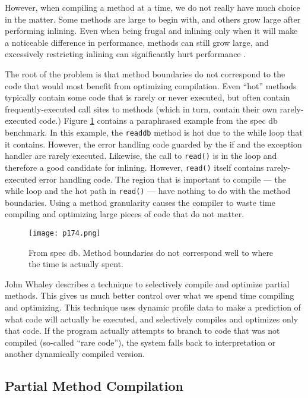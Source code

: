 However, when compiling a method at a time, we do not
really have much choice in the matter. Some methods are
large to begin with, and others grow large after performing
inlining. Even when being frugal and inlining only when it
will make a noticeable difference in performance, methods
can still grow large, and excessively restricting inlining can
significantly hurt performance \cite{suganuma2000overview}.


The root of the problem is that method boundaries do not
correspond to the code that would most benefit from optimizing compilation. Even “hot” methods typically contain
some code that is rarely or never executed, but often contain frequently-executed call sites to methods (which in turn,
contain their own rarely-executed code.) Figure \ref{fig:p174} contains a
paraphrased example from the spec db benchmark. In
this example, the \texttt{readdb} method is hot due to the while
loop that it contains. However, the error handling code
guarded by the if and the exception handler are rarely
executed. Likewise, the call to \texttt{read()} is in the loop and
therefore a good candidate for inlining. However, \texttt{read()}
itself contains rarely-executed error handling code. The region that is important to compile — the while loop and the
hot path in \texttt{read()} — have nothing to do with the method
boundaries. Using a method granularity causes the compiler
to waste time compiling and optimizing large pieces of code
that do not matter.


\begin{figure}[H]
	\centering
	\texttt{[image: p174.png]}
	\caption{From spec db. Method boundaries do not
    correspond well to where the time is actually spent.}
	\label{fig:p174}
\end{figure}

John Whaley\cite{whaley2001partial} describes a technique to selectively compile and
optimize partial methods. This gives us much better control
over what we spend time compiling and optimizing. This
technique uses dynamic profile data to make a prediction of
what code will actually be executed, and selectively compiles and optimizes only that code. If the program actually
attempts to branch to code that was not compiled (so-called
“rare code”), the system falls back to interpretation or another dynamically compiled version.

\subsection{Partial Method Compilation}



